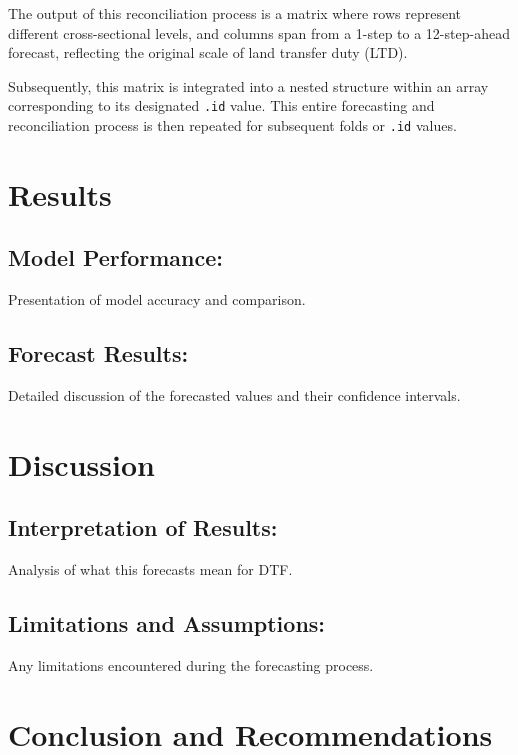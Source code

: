 \documentclass[11pt,a4paper,]{article}
\begin{document}
The output of this reconciliation process is a matrix where rows represent different cross-sectional levels, and columns span from a 1-step to a 12-step-ahead forecast, reflecting the original scale of land transfer duty (LTD).

Subsequently, this matrix is integrated into a nested structure within an array corresponding to its designated \texttt{.id} value. This entire forecasting and reconciliation process is then repeated for subsequent folds or \texttt{.id} values.

\section{Results}\label{results}

\subsection{Model Performance:}\label{model-performance}

Presentation of model accuracy and comparison.

\subsection{Forecast Results:}\label{forecast-results}

Detailed discussion of the forecasted values and their confidence intervals.

\section{Discussion}\label{discussion}

\subsection{Interpretation of Results:}\label{interpretation-of-results}

Analysis of what this forecasts mean for DTF.

\subsection{Limitations and Assumptions:}\label{limitations-and-assumptions}

Any limitations encountered during the forecasting process.

\section{Conclusion and Recommendations}\label{conclusion-and-recommendations}
\end{document}
